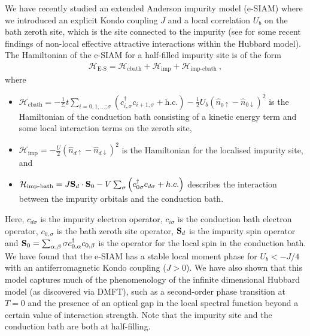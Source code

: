 \documentclass[reprint,hidelinks,onecolumn]{revtex4-2}
\begin{document}
We have recently studied an extended Anderson impurity model (e-SIAM) where we introduced an explicit Kondo coupling \(J\) and a local correlation \(U_b\) on the bath zeroth site, which is the site connected to the impurity (see \cite{gazizovaleblanc2023} for some recent findings of non-local effective attractive interactions within the Hubbard model). The Hamiltonian of the e-SIAM for a half-filled impurity site is of the form
\begin{equation}\begin{aligned}
	\label{siam_attr}
	\mathcal{H}_\text{E-S} = \mathcal{H}_\text{cbath} + \mathcal{H}_\text{imp} + \mathcal{H}_\text{imp-cbath}~,
\end{aligned}\end{equation}
where 
\begin{itemize}
	\item \(\mathcal{H}_\text{cbath} = -\frac{1}{\mathcal{Z}}t\sum_{i=0,1,\ldots;\sigma}\left(c^\dagger_{i,\sigma}c_{i+1,\sigma} + \text{h.c.}\right) - \frac{1}{2}U_b\left(\hat n_{0 \uparrow} - \hat n_{0 \downarrow}\right)^2\) is the Hamiltonian of the conduction bath consisting of a kinetic energy term and some local interaction terms on the zeroth site,
	\item \(\mathcal{H}_\text{imp} = - \frac{U}{2}\left(\hat n_{d \uparrow} - \hat n_{d \downarrow} \right) ^2\) is the Hamiltonian for the localised impurity site, and
	\item \(\mathcal{H}_\text{imp-bath} = J {\bf S}_d\cdot{\bf S}_0 - V \sum_{\sigma} \left(c^\dagger_{0\sigma} c_{d\sigma} + h.c.\right)\) describes the interaction between the impurity orbitals and the conduction bath.
\end{itemize}
Here, \(c_{d\sigma}\) is the impurity electron operator, \(c_{i\sigma}\) is the conduction bath electron operator, \(c_{0,\sigma}\) is the bath zeroth site operator, \({\bf S}_d\) is the impurity spin operator and \({\bf S}_0 = \sum_{\alpha,\beta}{\bf \sigma}c^\dagger_{0,\alpha}c_{0,\beta}\) is the operator for the local spin in the conduction bath. We have found that the e-SIAM has a stable local moment phase for \(U_b < -J/4\) with an antiferromagnetic Kondo coupling (\(J > 0\)). We have also shown that this model captures much of the phenomenology of the infinite dimensional Hubbard model (as discovered via DMFT), such as a second-order phase transition at \(T=0\) and the presence of an optical gap in the local spectral function beyond a certain value of interaction strength. Note that the impurity site and the conduction bath are both at half-filling.
\end{document}
